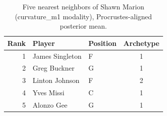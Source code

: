 \begin{table}[htbp]
  \centering\small
  \begin{tabular}{rllc}
    \toprule
    Rank & Player & Position & Archetype \\
    \midrule
    1 & James Singleton & F & 1 \\
    2 & Greg Buckner & G & 1 \\
    3 & Linton Johnson & F & 2 \\
    4 & Yves Missi & C & 1 \\
    5 & Alonzo Gee & G & 1 \\
    \bottomrule
  \end{tabular}
  \caption{Five nearest neighbors of Shawn Marion (curvature_m1 modality), Procrustes-aligned posterior mean.}
  \label{tab:Shawn_Marion_neighbors_curvature_m1}
\end{table}

